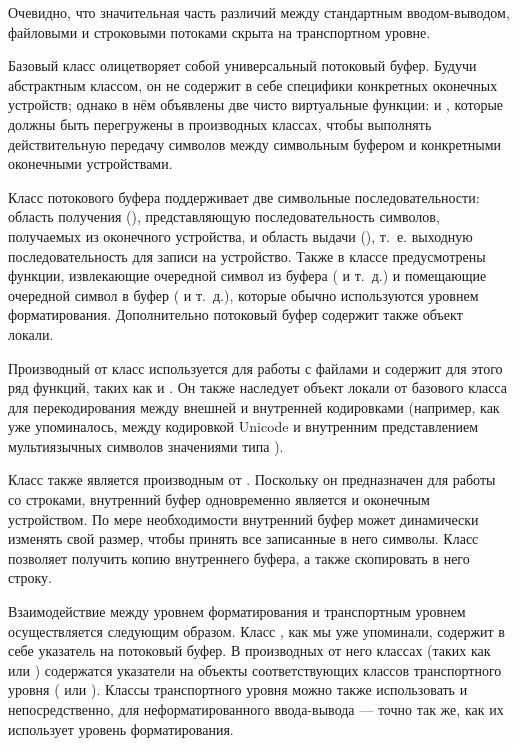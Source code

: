 Очевидно, что значительная часть различий между стандартным вводом-выводом, файловыми и строковыми потоками скрыта на
транспортном уровне.

Базовый класс  олицетворяет собой универсальный потоковый буфер. Будучи абстрактным
классом, он не содержит в себе специфики конкретных оконечных устройств; однако в нём объявлены две чисто виртуальные
функции:  и , которые должны быть перегружены в
производных классах, чтобы выполнять действительную передачу символов между символьным буфером и конкретными оконечными
устройствами.

Класс потокового буфера поддерживает две символьные последовательности: область получения (),
представляющую последовательность символов, получаемых из оконечного устройства, и область выдачи
(), т.~е. выходную последовательность для записи на устройство. Также в классе предусмотрены
функции, извлекающие очередной символ из буфера ( и т.~д.) и помещающие очередной символ в
буфер ( и т.~д.), которые обычно используются уровнем форматирования. Дополнительно
потоковый буфер содержит также объект локали.

Производный от  класс  используется для работы с файлами и
содержит для этого ряд функций, таких как  и . Он также
наследует объект локали от базового класса для перекодирования между внешней и внутренней кодировками (например, как
уже упоминалось, между кодировкой Unicode и внутренним представлением мультиязычных символов значениями типа
).

Класс  также является производным от . Поскольку он
предназначен для работы со строками, внутренний буфер одновременно является и оконечным устройством.  По мере
необходимости внутренний буфер может динамически изменять свой размер, чтобы принять все записанные в него символы.
Класс позволяет получить копию внутреннего буфера, а также скопировать в него строку.

Взаимодействие между уровнем форматирования и транспортным уровнем осуществляется следующим образом. Класс
, как мы уже упоминали, содержит в себе указатель на потоковый буфер. В производных от него
классах (таких как  или ) содержатся указатели на
объекты соответствующих классов транспортного уровня ( или
). Классы транспортного уровня можно также использовать и непосредственно, для
неформатированного ввода-вывода --- точно так же, как их использует уровень форматирования.

